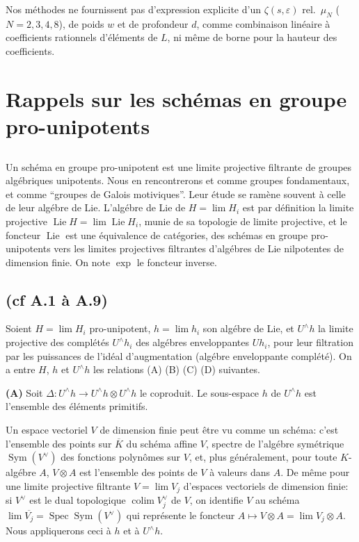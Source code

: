 \documentclass[11pt,a4paper]{article}
\theoremstyle{plain}
\theoremstyle{definition}
\DeclareMathOperator{\Spec}{Spec}
\DeclareMathOperator{\Lie}{Lie}
\DeclareMathOperator{\colim}{colim}
\DeclareMathOperator{\Sym}{Sym}
\begin{document}
Nos m\'ethodes ne fournissent pas d'expression explicite d'un $\zeta(s,\varepsilon)$ rel.~$\mu_N$ ($N=2,3,4,8$), de poids $w$ et de profondeur $d$, comme combinaison lin\'eaire \`a coefficients rationnels d'\'el\'ements de $L$, ni m\^eme de borne pour la hauteur des coefficients.

\section{Rappels sur les sch\'emas en groupe pro-unipotents}
\label{sec:1}

\subsection{}
Un sch\'ema en groupe pro-unipotent est une limite projective filtrante de groupes alg\'ebriques unipotents. Nous en rencontrerons et comme groupes fondamentaux, et comme ``groupes de Galois motiviques''. Leur \'etude se ram\`ene souvent \`a celle de leur alg\'ebre de Lie. L'alg\'ebre de Lie de $H = \lim H_i$ est par d\'efinition la limite projective $\Lie H = \lim \Lie H_i$, munie de sa topologie de limite projective, et le foncteur $\Lie$ est une \'equivalence de cat\'egories, des sch\'emas en groupe pro-unipotents vers les limites projectives filtrantes d'alg\'ebres de Lie nilpotentes de dimension finie. On note $\exp$ le foncteur inverse.

\subsection{(cf \cite{1} A.1 \`a A.9)}
Soient $H = \lim H_i$ pro-unipotent, $h = \lim h_i$ son alg\'ebre de Lie, et $U^{\wedge}h$ la limite projective des compl\'et\'es $U^{\wedge}h_i$ des alg\'ebres enveloppantes $Uh_i$, pour leur filtration par les puissances de l'id\'eal d'augmentation (alg\'ebre enveloppante compl\'et\'e). On a entre $H$, $h$ et $U^{\wedge}h$ les relations (A) (B) (C) (D) suivantes.

\textbf{(A)} Soit $\Delta: U^{\wedge}h \to U^{\wedge}h \otimes U^{\wedge}h$ le coproduit. Le sous-espace $h$ de $U^{\wedge}h$ est l'ensemble des \'el\'ements primitifs.

Un espace vectoriel $V$ de dimension finie peut \^etre vu comme un sch\'ema: c'est l'ensemble des points sur $\overline{K}$ du sch\'ema affine $V$, spectre de l'alg\'ebre sym\'etrique $\Sym(V^{\vee})$ des fonctions polyn\^omes sur $V$, et, plus g\'en\'eralement, pour toute $K$-alg\'ebre $A$, $V \otimes A$ est l'ensemble des points de $V$ \`a valeurs dans $A$. De m\^eme pour une limite projective filtrante $V = \lim V_j$ d'espaces vectoriels de dimension finie: si $V^{\vee}$ est le dual topologique $\colim V_j^{\vee}$ de $V$, on identifie $V$ au sch\'ema $\lim \overline{V_j} = \Spec \Sym(V^{\vee})$ qui repr\'esente le foncteur $A \mapsto V \otimes A = \lim V_j \otimes A$. Nous appliquerons ceci \`a $h$ et \`a $U^{\wedge}h$.
\end{document}
